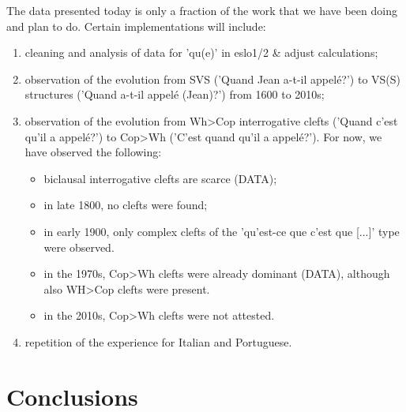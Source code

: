 \documentclass[fleqn,10pt]{wlscirep}
\begin{document}
The data presented today is only a fraction of the work that we have been doing and plan to do. Certain implementations will include:
\begin{enumerate}
    \item cleaning and analysis of data for 'qu(e)' in eslo1/2 \& adjust calculations;
    \item \vspace*{-2mm} observation of the evolution from SVS ('Quand Jean a-t-il appelé?') to VS(S) structures ('Quand a-t-il appelé (Jean)?') from 1600 to 2010s; 
    \item \vspace*{-2mm} observation of the evolution from Wh>Cop interrogative clefts ('Quand c'est qu'il a appelé?') to Cop>Wh ('C'est quand qu'il a appelé?'). For now, we have observed the following:
    \begin{itemize}
        \item[\ding{227}] \vspace*{-2mm} biclausal interrogative clefts are scarce (DATA);
        \item[\ding{227}] \vspace*{-2mm} in late 1800, no clefts were found;
        \item[\ding{227}] \vspace*{-2mm} in early 1900, only complex clefts of the 'qu'est-ce que c'est que [...]' type were observed.
        \item[\ding{227}] \vspace*{-2mm} in the 1970s, Cop>Wh clefts were already dominant (DATA), although also WH>Cop clefts were present.
        \item[\ding{227}] \vspace*{-2mm} in the 2010s, Cop>Wh clefts were not attested.
    \end{itemize}
    \item \vspace*{-2mm} repetition of the experience for Italian and Portuguese. 
\end{enumerate}

\section*{Conclusions}
\end{document}
